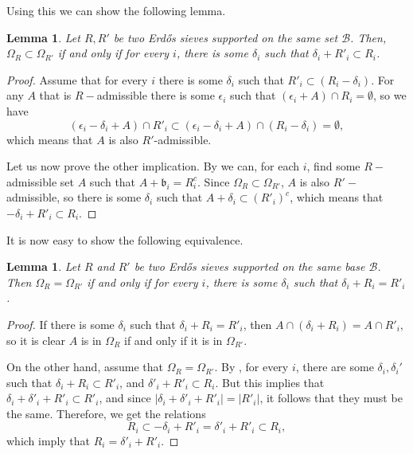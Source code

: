 \documentclass[a4paper,11pt,reqno]{amsart}
\theoremstyle{plain}
\newtheorem{lemma}[theorem]{Lemma}
\theoremstyle{remark}
\newcommand{\cb}{\mathcal{B}}
\newcommand{\gb}{\mathfrak{b}}
\begin{document}
			Using this we can show the following lemma.
			
			\begin{lemma}
				\label{lm: Conditions for Omega r subset omega s}
				Let $R, R'$ be two Erdős sieves supported on the same set $\cb$. Then, $\Omega_{R} \subset \Omega_{R'}$ if and only if for every $i$, there is some $\delta_i$ such that $\delta_i + R'_i \subset R_i$. 
			\end{lemma}
			
			
			\begin{proof}
				Assume that for every $i$ there is some $\delta_i$ such that $R'_i \subset (R_i-\delta_i)$. For any $A$ that is $R-$admissible there is some $\epsilon_i$ such that $(\epsilon_i + A) \cap R_i = \emptyset$,  so we have $$(\epsilon_i-\delta_i + A) \cap R'_i \subset (\epsilon_i-\delta_i + A) \cap   (R_i-\delta_i) = \emptyset,$$ which means that $A$ is also $R'$-admissible.
				
				Let us now prove the other implication. By   we can, for each $i$, find some $R-$admissible set $A$ such that $A + \gb_i = R_i^c$. Since $\Omega_{R} \subset \Omega_{R'}$, $A$ is also $R'-$admissible, so there is some $\delta_i$ such that $A+\delta_i \subset (R'_i)^c$, which means that $-\delta_i + R'_i \subset R_i$. 
			\end{proof}
			
			It is now easy to show the following equivalence.
			
			\begin{lemma}
				\label{lm: OmegaR = OmegaS same base}
				Let $R$ and $R'$ be two Erdős sieves supported on the same base $\cb$. Then $\Omega_{R} = \Omega_{R'}$ if and only if for every $i$, there is some $\delta_i$ such that $\delta_i + R_i = R'_i$.
			\end{lemma}
			
			\begin{proof}
				If there is some $\delta_i$ such that $\delta_i + R_i = R'_i$, then $ A \cap (\delta_i + R_i) = A \cap R'_i, $ so it is clear $A$ is in $\Omega_{R}$ if and only if it is in $\Omega_{R'}$.
				
				On the other hand, assume that $\Omega_{R} = \Omega_{R'}$. By  , for every $i$, there are some $\delta_i,\delta_i'$ such that $\delta_i + R_i \subset R'_i$, and $\delta'_i + R'_i \subset R_i$. But this implies that $\delta_i + \delta'_i + R'_i \subset R'_i$, and since $|\delta_i + \delta'_i + R'_i| = |R'_i|$, it follows that they must be the same. Therefore, we get the relations $$R_i \subset -\delta_i + R'_i  = \delta'_i + R'_i \subset R_i,$$ which imply that $R_i = \delta'_i +R'_i$.
			\end{proof}
			
\end{document}
